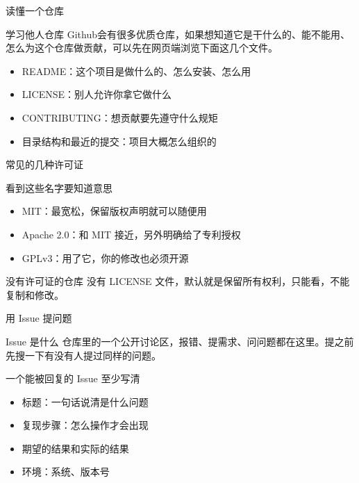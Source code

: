\documentclass[aspectratio=169]{beamer}
\begin{document}
\begin{frame}{读懂一个仓库}
	\begin{block}{学习他人仓库}
		\hspace*{2em}Github会有很多优质仓库，如果想知道它是干什么的、能不能用、怎么为这个仓库做贡献，可以先在网页端浏览下面这几个文件。
		\begin{itemize}
			\item README：这个项目是做什么的、怎么安装、怎么用
			\item LICENSE：别人允许你拿它做什么
			\item CONTRIBUTING：想贡献要先遵守什么规矩
			\item 目录结构和最近的提交：项目大概怎么组织的
		\end{itemize}
	\end{block}
\end{frame}

\begin{frame}{常见的几种许可证}
	\begin{block}{看到这些名字要知道意思}
		\begin{itemize}
			\item MIT：最宽松，保留版权声明就可以随便用
			\item Apache 2.0：和 MIT 接近，另外明确给了专利授权
			\item GPLv3：用了它，你的修改也必须开源
		\end{itemize}
	\end{block}
	\begin{block}{没有许可证的仓库}
		\hspace*{2em}没有 LICENSE 文件，默认就是保留所有权利，只能看，不能复制和修改。
	\end{block}
\end{frame}

\begin{frame}{用 Issue 提问题}
	\begin{block}{Issue 是什么}
		\hspace*{2em}仓库里的一个公开讨论区，报错、提需求、问问题都在这里。提之前先搜一下有没有人提过同样的问题。
	\end{block}
	\begin{block}{一个能被回复的 Issue 至少写清}
		\begin{itemize}
			\item 标题：一句话说清是什么问题
			\item 复现步骤：怎么操作才会出现
			\item 期望的结果和实际的结果
			\item 环境：系统、版本号
		\end{itemize}
	\end{block}
\end{frame}
\end{document}
